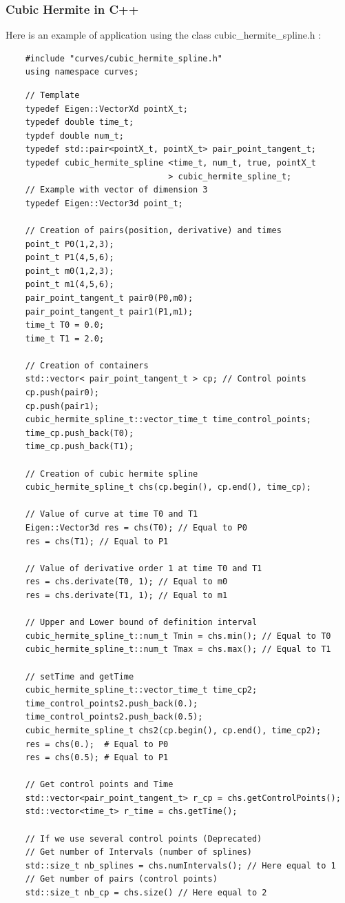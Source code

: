 \documentclass{article}
\begin{document}
    \subsubsection{Cubic Hermite in C++}
    Here is an example of application using the class cubic\_hermite\_spline.h :\\
    \begin{lstlisting}
    #include "curves/cubic_hermite_spline.h"
    using namespace curves;
    \end{lstlisting}
    \begin{lstlisting}
    // Template
    typedef Eigen::VectorXd pointX_t;
    typedef double time_t;
    typdef double num_t;
    typedef std::pair<pointX_t, pointX_t> pair_point_tangent_t;
    typedef cubic_hermite_spline <time_t, num_t, true, pointX_t 
                                 > cubic_hermite_spline_t;
    // Example with vector of dimension 3
    typedef Eigen::Vector3d point_t;
    
    // Creation of pairs(position, derivative) and times
    point_t P0(1,2,3);
    point_t P1(4,5,6);
    point_t m0(1,2,3);
    point_t m1(4,5,6);
    pair_point_tangent_t pair0(P0,m0);
    pair_point_tangent_t pair1(P1,m1);
    time_t T0 = 0.0;
    time_t T1 = 2.0;
    
    // Creation of containers
    std::vector< pair_point_tangent_t > cp; // Control points
    cp.push(pair0);
    cp.push(pair1);
    cubic_hermite_spline_t::vector_time_t time_control_points;
    time_cp.push_back(T0);
    time_cp.push_back(T1);
    
    // Creation of cubic hermite spline
    cubic_hermite_spline_t chs(cp.begin(), cp.end(), time_cp);
    
    // Value of curve at time T0 and T1
    Eigen::Vector3d res = chs(T0); // Equal to P0
    res = chs(T1); // Equal to P1
    
    // Value of derivative order 1 at time T0 and T1
    res = chs.derivate(T0, 1); // Equal to m0
    res = chs.derivate(T1, 1); // Equal to m1
    
    // Upper and Lower bound of definition interval
    cubic_hermite_spline_t::num_t Tmin = chs.min(); // Equal to T0
    cubic_hermite_spline_t::num_t Tmax = chs.max(); // Equal to T1
    
    // setTime and getTime
    cubic_hermite_spline_t::vector_time_t time_cp2;
    time_control_points2.push_back(0.);
    time_control_points2.push_back(0.5);
    cubic_hermite_spline_t chs2(cp.begin(), cp.end(), time_cp2);
    res = chs(0.);  # Equal to P0
    res = chs(0.5); # Equal to P1
    
    // Get control points and Time
    std::vector<pair_point_tangent_t> r_cp = chs.getControlPoints();
    std::vector<time_t> r_time = chs.getTime();
    
    // If we use several control points (Deprecated)
    // Get number of Intervals (number of splines)
    std::size_t nb_splines = chs.numIntervals(); // Here equal to 1
    // Get number of pairs (control points)
    std::size_t nb_cp = chs.size() // Here equal to 2
    \end{lstlisting}
    
\end{document}
